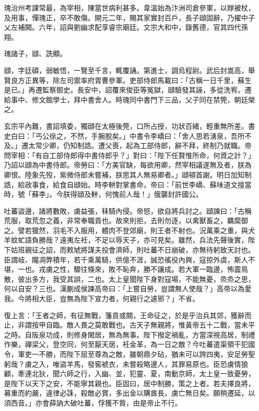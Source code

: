 \begin{pinyinscope}
 瑰治州考課常最，為宰相，陳當世病利甚多。韋溫始為汴洲司倉參軍，以賕被杖，及用事，憚瑰正，卒不敢傷。開元二年，賜其家實封百戶，長子頲固辭，乃擢中子乂左補闕。六年，詔與劉幽求配享睿宗廟廷。文宗大和中，錄舊德，官其四代孫翔。



 瑰諸子，頲、詵顯。



 頲，字廷碩，弱敏悟，一覽至千言，輒覆誦。第進士，調烏程尉。武后封嵩高，舉賢良方正異等，除左司禦率府胄曹參軍。吏部侍郎馬載曰：「古稱一日千里，蘇生是已。」再遷監察御史。長安中，詔覆來俊臣等冤獄，頲驗發其誣，多從洗宥。遷給事中、修文館學士，拜中書舍人。時瑰同中書門下三品，父子同在禁筦，朝廷榮之。



 玄宗平內難，書詔填委，獨頲在太極後筦，口所占授，功狀百緒，輕重無所差。書史白曰：「丐公徐之，不然，手腕脫矣。」中書令李嶠曰：「舍人思若湧泉，吾所不及。」遷太常少卿，仍知制誥。遭父喪，起為工部侍郎，辭不拜，終制乃就職。帝問宰相：「有自工部侍郎得中書侍郎乎？」對曰：「陛下任賢惟所命，何資之計？」乃詔以頲為中書侍郎。帝勞曰：「方美官缺，每欲用卿，然宰相議遂無及者，朕為卿恨。陸象先歿，紫微侍郎未嘗補，朕思其人無易卿者。」頲頓首謝。明日加知制誥，給政事食，給食自頲始。時李軿對掌書命，帝曰：「前世李嶠、蘇味道文擅當時，號「蘇李」。今朕得頲及軿，何愧前人哉！」俄襲封許國公。



 吐蕃盜邊，諸將數敗，虜益張，秣騎內侵。帝怒，欲自將兵討之。頲諫曰：「古稱荒服，取荒忽之義，非常奉職貢也。故來則拒，去則勿逐，以禽獸畜之，羈縻御之。譬若獵然，羽毛不入服用，體肉不登郊廟，則王者不射也。況萬乘之重，與犬羊蚊虻語負勝哉？遠夷左衽，不足以辱天子，亦可見矣。雖然，兵法先聲後實，陛下姑班親征之詔，而敕虓將謀夫投會濟師，則吐蕃不日崩破，亦無待躬致天討也。臣謂岐、隴凋弊積年，若千乘萬騎，供億不涯，誠恐徭役內興，寇掠外虞，斯人不堪，一也。戎虜之性，驟往倏來，敗不恥奔，勝不讓成。若大軍一臨邊，怖震鳥散，彼出多方，我受其誤，二也。太上皇聞陛下身對寇場，不能無憂，烝烝之思，何以自安？三也。漢蒯成侯諫高帝曰：「上嘗自勞，豈謂無人使哉？」高帝以為愛我。今將相大臣，豈無為陛下宣力者，何親行之遽邪？」不省。



 復上言：「王者之師，有征無戰，籓貢或闕，王命征之，於是乎治兵其郊，獲辭而止，非謂按甲自臨。敵人畏之莫敢戰也。古天子無親將，惟黃帝五十二戰，當未平之時。自阪泉功成，則修身閑居，無為無事。陛下撥定禍亂，方當深視高居，制禮作樂，禪梁父，登空同，何至厭天居，衽金革，為一日之敵？今吐蕃遣渠領干犯國令，軍吏一不勝，而陛下屈至尊為之敵，雖朝鼎夕砧，猶未可以誇四夷，安足勞聖躬哉？虜之入，唯盜羊馬，發窖裭衣，未嘗殺略邊人，其罪易原也。臣恐虜情狼顧，牽連北狄，聞六師之行，入幽、並，犯靈、夏，南動京師，太上皇一致憂勞，是陛下以天下之安，不能寧其親也。臣固曰，居中制勝，策之上者。若夫擇良將，募重而約嚴，違律必誅，殺敵必賞，多出金以購酋長，虜亡無日矣。願稍遷延，以須西音。」亦會薛訥大破吐蕃，俘獲不貲，由是帝止不行。




\end{pinyinscope}
